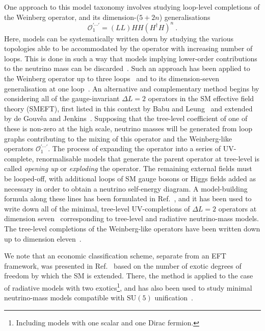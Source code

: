 One approach to this model taxonomy involves studying loop-level completions of
the Weinberg operator, and its dimension-($5+2n$) generalisations
\begin{equation*}
 \mathcal{O}_1^{\prime \cdots \prime} = (LL)HH(H^\dagger H)^n  \ .
\end{equation*}
Here, models can be systematically written down by studying the various
topologies able to be accommodated by the operator with increasing number of
loops. This is done in such a way that models implying lower-order contributions
to the neutrino mass can be discarded~\cite{Farzan:2012ev}. Such an approach has
been applied to the Weinberg operator up to three loops~\cite{Bonnet:2012kz,
  Sierra:2014rxa, Cepedello:2018rfh} and to its dimension-seven generalisation
at one loop~\cite{Cepedello:2017eqf}. An alternative and complementary method
begins by considering all of the gauge-invariant $\Delta L = 2$ operators in the
SM effective field theory (SMEFT), first listed in this context by Babu and
Leung~\cite{Babu:2001ex} and extended by de Gouv\^{e}a and
Jenkins~\cite{deGouvea:2007qla}. Supposing that the tree-level coefficient of
one of these is non-zero at the high scale, neutrino masses will be generated
from loop graphs contributing to the mixing of this operator and the
Weinberg-like operators $\mathcal{O}_1^{\prime \cdots \prime}$. The process of
expanding the operator into a series of UV-complete, renormalisable models that
generate the parent operator at tree-level is called \emph{opening up} or
\emph{exploding} the operator. The remaining external fields must be looped-off,
with additional loops of SM gauge bosons or Higgs fields added as necessary in
order to obtain a neutrino self-energy diagram. A model-building formula along
these lines has been formulated in Ref.~\cite{PhysRevD.87.073007}, and it has
been used to write down all of the minimal, tree-level UV-completions of
$\Delta L = 2$ operators at dimension seven~\cite{Cai:2014kra} corresponding to
tree-level and radiative neutrino-mass models. The tree-level completions of the
Weinberg-like operators have been written down up to dimension
eleven~\cite{Cai:2014kra, Bonnet:2009ej, Anamiati:2018cuq}.

We note that an economic classification scheme, separate from an EFT framework,
was presented in Ref.~\cite{Klein:2019iws} based on the number of exotic degrees
of freedom by which the SM is extended. There, the method is applied to the case
of radiative models with two exotics\footnote{Including models with one scalar
  and one Dirac fermion.}, and has also been used to study minimal neutrino-mass
models compatible with $\mathrm{SU}(5)$ unification~\cite{Klein:2019jgb}.

